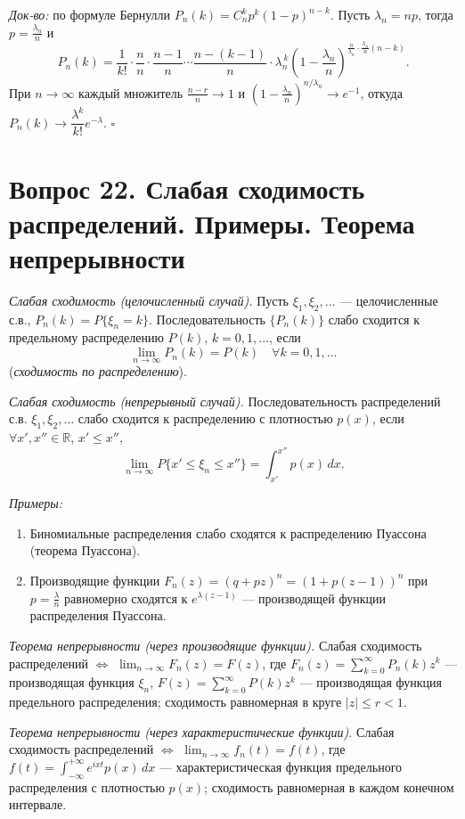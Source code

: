 \textit{Док-во:} по формуле Бернулли $P_n(k)=C_n^k p^k(1-p)^{n-k}$. Пусть $\lambda_n=np$, тогда $p=\tfrac{\lambda_n}{n}$ и
\[ P_n(k)=\frac{1}{k!}\cdot\frac{n}{n}\cdot\frac{n-1}{n}\cdots\frac{n-(k-1)}{n}\cdot\lambda_n^{\,k}\left(1-\frac{\lambda_n}{n}\right)^{\frac{n}{\lambda_n}\cdot\frac{\lambda_n}{n}(n-k)}. \]
При $n\to\infty$ каждый множитель $\tfrac{n-r}{n}\to1$ и $\left(1-\tfrac{\lambda_n}{n}\right)^{n/\lambda_n}\to e^{-1}$, откуда $P_n(k)\to\dfrac{\lambda^k}{k!}e^{-\lambda}$. \hfill$\square$

\section*{Вопрос 22. Слабая сходимость распределений. Примеры. Теорема непрерывности}

\textit{Слабая сходимость (целочисленный случай).} Пусть $\xi_1,\xi_2,\dots$ — целочисленные с.в., $P_n(k)=P\{\xi_n=k\}$. Последовательность $\{P_n(k)\}$ слабо сходится к предельному распределению $P(k)$, $k=0,1,\dots$, если
\[ \lim_{n\to\infty}P_n(k)=P(k)\quad\forall k=0,1,\dots \]
(\textit{сходимость по распределению}).

\textit{Слабая сходимость (непрерывный случай).} Последовательность распределений с.в. $\xi_1,\xi_2,\dots$ слабо сходится к распределению с плотностью $p(x)$, если $\forall x',x''\in\mathbb{R}$, $x'\le x''$,
\[ \lim_{n\to\infty}P\{x'\le\xi_n\le x''\}=\int_{x'}^{x''}p(x)\,dx. \]

\textit{Примеры:}
\begin{enumerate}
  \item Биномиальные распределения слабо сходятся к распределению Пуассона (теорема Пуассона).
  \item Производящие функции $F_n(z)=(q+pz)^n=(1+p(z-1))^n$ при $p=\tfrac{\lambda}{n}$ равномерно сходятся к $e^{\lambda(z-1)}$ — производящей функции распределения Пуассона.
\end{enumerate}

\textit{Теорема непрерывности (через производящие функции).} Слабая сходимость распределений $\Leftrightarrow$ $\lim_{n\to\infty}F_n(z)=F(z)$, где $F_n(z)=\sum_{k=0}^\infty P_n(k)z^k$ — производящая функция $\xi_n$, $F(z)=\sum_{k=0}^\infty P(k)z^k$ — производящая функция предельного распределения; сходимость равномерная в круге $|z|\le r<1$.

\textit{Теорема непрерывности (через характеристические функции).} Слабая сходимость распределений $\Leftrightarrow$ $\lim_{n\to\infty}f_n(t)=f(t)$, где $f(t)=\int_{-\infty}^{+\infty}e^{ixt}p(x)\,dx$ — характеристическая функция предельного распределения с плотностью $p(x)$; сходимость равномерная в каждом конечном интервале.

